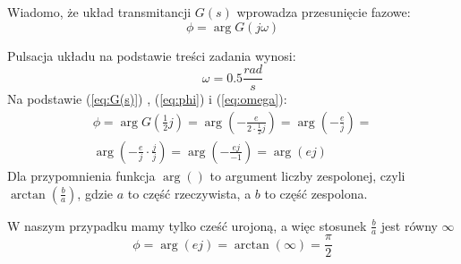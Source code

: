 Wiadomo, że układ  transmitancji $G(s)$ wprowadza przesunięcie fazowe:
\begin{equation}
\label{eq:phi}
\phi = \arg G(j\omega)
\end{equation}

Pulsacja układu na podstawie treści zadania wynosi:
\begin{equation}
\label{eq:omega}
 \omega = 0.5 \frac{rad}{s}
\end{equation}
Na podstawie (\ref{eq:G(s)}) ,  (\ref{eq:phi}) i  (\ref{eq:omega}):
\begin{equation}
\begin{split}
\phi = \arg G\left( \frac{1}{2} j\right)  = \arg \left( - \frac{e}{ 2 \cdot \frac{1}{2} j}  \right)   = \arg \left( - \frac{e}{j} \right) =  \\ \arg \left( - \frac{e}{j}\cdot \frac{j}{j} \right)  = \arg \left( - \frac{e j}{-1} \right) = \arg \left( e j \right) 
\end{split}
\end{equation}
Dla przypomnienia funkcja $\arg()$ to argument liczby zespolonej, czyli $ \arctan\left( \frac{b}{a}\right) $, gdzie $a$ to część rzeczywista, a $b$ to część zespolona.

W naszym przypadku mamy tylko cześć urojoną, a więc stosunek $ \frac{b}{a}$ jest równy $\infty$ 
\begin{equation}
\phi = \arg(ej) = \arctan(\infty) = \frac{\pi}{2}
\end{equation}





